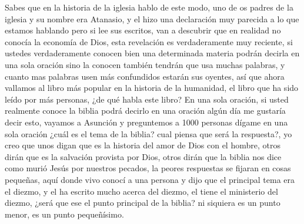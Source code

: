 \documentclass[12pt]{article}
\begin{document}
Sabes que en la historia de la iglesia hablo de este modo, uno de os padres de la iglesia y su nombre era Atanasio, y el hizo una declaración muy parecida a lo que estamos hablando pero si lee sus escritos, van a descubrir que en realidad no conocía la economía de Dios, esta revelación es verdaderamente muy reciente, si ustedes verdaderamente conocen bien una determinada materia podrán decirla en una sola oración sino la conocen también tendrán que usa muchas palabras, y cuanto mas palabras usen más confundidos estarán sus oyentes, así que ahora vallamos al libro más popular en la historia de la humanidad, el libro que ha sido leído por más personas, ¿de qué habla este libro? En una sola oración, si usted realmente conoce la biblia podrá decirlo en una oración algún día me gustaría decir esto, vayamos a Asunción y preguntemos a 1000 personas dígame en una sola oración ¿cuál es el tema de la biblia? cual piensa que será la respuesta?, yo creo que unos digan que es la historia del amor de Dios con el hombre, otros dirán que es la salvación provista por Dios, otros dirán que la biblia nos dice como murió Jesús por nuestros pecados, la peores respuestas se fijaran en cosas pequeñas, aquí donde vivo conocí a una persona y dijo que el principal tema era el diezmo, y el ha escrito mucho acerca del diezmo, el tiene el ministerio del diezmo, ¿será que ese el punto principal de la biblia? ni siquiera es un punto menor, es un punto pequeñísimo.\\
\end{document}
